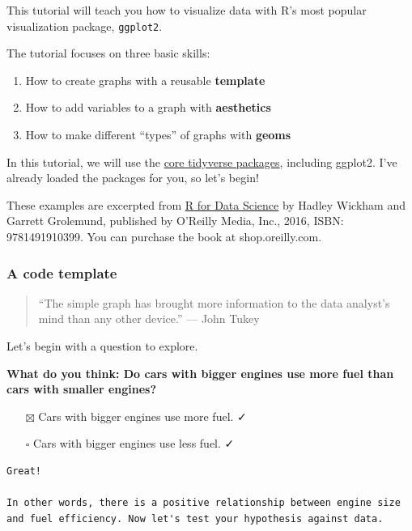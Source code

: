 \documentclass[
]{article}
\providecommand{\tightlist}{%
  \setlength{\itemsep}{0pt}\setlength{\parskip}{0pt}}
\begin{document}
This tutorial will teach you how to visualize data with R's most popular
visualization package, \texttt{ggplot2}.

The tutorial focuses on three basic skills:

\begin{enumerate}
\def\labelenumi{\arabic{enumi}.}
\tightlist
\item
  How to create graphs with a reusable \textbf{template}
\item
  How to add variables to a graph with \textbf{aesthetics}
\item
  How to make different ``types'' of graphs with \textbf{geoms}
\end{enumerate}

In this tutorial, we will use the \href{http://tidyverse.org/}{core
tidyverse packages}, including ggplot2. I've already loaded the packages
for you, so let's begin!

These examples are excerpted from \href{https://r4ds.had.co.nz}{R for
Data Science} by Hadley Wickham and Garrett Grolemund, published by
O'Reilly Media, Inc., 2016, ISBN: 9781491910399. You can purchase the
book at shop.oreilly.com.

\hypertarget{a-code-template}{%
\subsubsection{A code template}\label{a-code-template}}

\begin{quote}
``The simple graph has brought more information to the data analyst's
mind than any other device.'' --- John Tukey
\end{quote}

Let's begin with a question to explore.

\textbf{What do you think: Do cars with bigger engines use more fuel
than cars with smaller engines?}

\begin{itemize}
\tightlist
\item[$\boxtimes$]
  Cars with bigger engines use more fuel. ✓
\item[$\square$]
  Cars with bigger engines use less fuel. ✓
\end{itemize}

\begin{verbatim}
Great! 

In other words, there is a positive relationship between engine size and fuel efficiency. Now let's test your hypothesis against data.
\end{verbatim}
\end{document}
